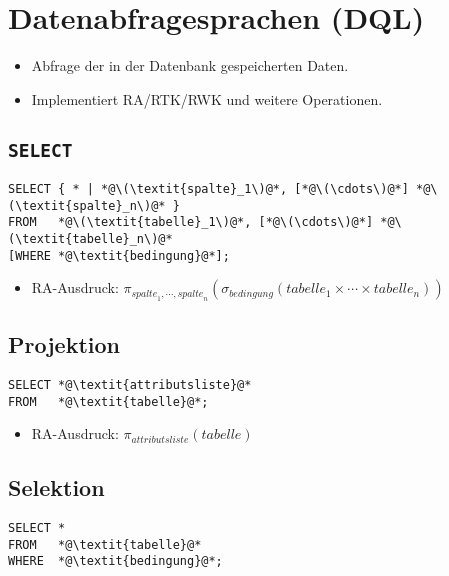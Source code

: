 \documentclass[a4paper, 11pt, accentcolor = tud3b]{tudreport}
\begin{document}
        \section{Datenabfragesprachen (DQL)} %
            \begin{itemize}
            	\item Abfrage der in der Datenbank gespeicherten Daten.
            	\item Implementiert RA/RTK/RWK und weitere Operationen.
            \end{itemize}

            \subsection{\lstinline|SELECT|} %
                \begin{lstlisting}
SELECT { * | *@\(\textit{spalte}_1\)@*, [*@\(\cdots\)@*] *@\(\textit{spalte}_n\)@* }
FROM   *@\(\textit{tabelle}_1\)@*, [*@\(\cdots\)@*] *@\(\textit{tabelle}_n\)@*
[WHERE *@\textit{bedingung}@*];
                \end{lstlisting}
                
                \begin{itemize}
                	\item RA-Ausdruck: \( \pi_{ \textit{spalte}_1, \cdots, \textit{spalte}_n } ( \sigma _ \textit{bedingung} ( \textit{tabelle}_1 \times \cdots \times \textit{tabelle}_n ) ) \)
                \end{itemize}

            \subsection{Projektion} %
                \begin{lstlisting}
SELECT *@\textit{attributsliste}@*
FROM   *@\textit{tabelle}@*;
                \end{lstlisting}
                
                \begin{itemize}
                	\item RA-Ausdruck: \( \pi _ \textit{attributsliste} (\textit{tabelle}) \)
                \end{itemize}

            \subsection{Selektion} %
                \begin{lstlisting}
SELECT *
FROM   *@\textit{tabelle}@*
WHERE  *@\textit{bedingung}@*;
                \end{lstlisting}
                
\end{document}
